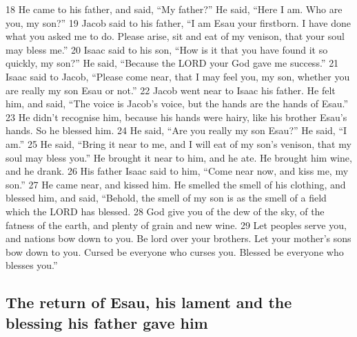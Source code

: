 {18} He came to his father, and said, ``My father?'' He said, ``Here I
am. Who are you, my son?'' {19} Jacob said to his father, ``I am Esau
your firstborn. I have done what you asked me to do. Please arise, sit
and eat of my venison, that your soul may bless me.'' {20} Isaac said to
his son, ``How is it that you have found it so quickly, my son?'' He
said, ``Because the LORD your God gave me success.'' {21} Isaac said to
Jacob, ``Please come near, that I may feel you, my son, whether you are
really my son Esau or not.'' {22} Jacob went near to Isaac his father.
He felt him, and said, ``The voice is Jacob's voice, but the hands are
the hands of Esau.'' {23} He didn't recognise him, because his hands
were hairy, like his brother Esau's hands. So he blessed him. {24} He
said, ``Are you really my son Esau?'' He said, ``I am.'' {25} He said,
``Bring it near to me, and I will eat of my son's venison, that my soul
may bless you.'' He brought it near to him, and he ate. He brought him
wine, and he drank. {26} His father Isaac said to him, ``Come near now,
and kiss me, my son.'' {27} He came near, and kissed him. He smelled the
smell of his clothing, and blessed him, and said, ``Behold, the smell of
my son is as the smell of a field which the LORD has blessed. {28} God
give you of the dew of the sky, of the fatness of the earth, and plenty
of grain and new wine. {29} Let peoples serve you, and nations bow down
to you. Be lord over your brothers. Let your mother's sons bow down to
you. Cursed be everyone who curses you. Blessed be everyone who blesses
you.''

\hypertarget{the-return-of-esau-his-lament-and-the-blessing-his-father-gave-him}{%
\subsection{The return of Esau, his lament and the blessing his father
gave
him}\label{the-return-of-esau-his-lament-and-the-blessing-his-father-gave-him}}

